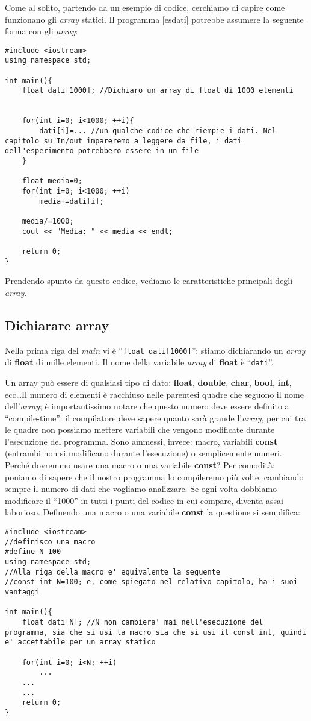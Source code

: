 Come al solito, partendo da un esempio di codice, cerchiamo di capire come funzionano gli \emph{array} statici. Il programma \ref{esdati} potrebbe assumere la seguente forma con gli \emph{array}:

\begin{lstlisting}
#include <iostream>
using namespace std;

int main(){
	float dati[1000]; //Dichiaro un array di float di 1000 elementi
	
	
	for(int i=0; i<1000; ++i){
		dati[i]=... //un qualche codice che riempie i dati. Nel capitolo su In/out impareremo a leggere da file, i dati dell'esperimento potrebbero essere in un file
	}
	
	float media=0;
	for(int i=0; i<1000; ++i)
		media+=dati[i];
	
	media/=1000;
	cout << "Media: " << media << endl;
	
	return 0;
}
\end{lstlisting}

Prendendo spunto da questo codice, vediamo le caratteristiche principali degli \emph{array}.
\subsection{Dichiarare array}

Nella prima riga del \emph{main} vi è ``\lstinline|float dati[1000]|'': stiamo dichiarando un \emph{array} di \textbf{float} di mille elementi. Il nome della variabile \emph{array} di \textbf{float} è ``\verb|dati|''. 
	
Un array può essere di qualsiasi tipo di dato: \textbf{float}, \textbf{double}, \textbf{char}, \textbf{bool}, \textbf{int}, ecc\ldots Il numero di elementi è racchiuso nelle parentesi quadre che seguono il nome dell'\emph{array}; è importantissimo notare che questo numero deve essere definito a ``compile-time'': il compilatore deve sapere quanto sarà grande l'\emph{array}, per cui tra le quadre non possiamo mettere variabili che vengono modificate durante l'esecuzione del programma. Sono ammessi, invece: macro, variabili \textbf{const} (entrambi non si modificano durante l'esecuzione) o semplicemente numeri. Perché dovremmo usare una macro o una variabile \textbf{const}? Per comodità: poniamo di sapere che il nostro programma lo compileremo più volte, cambiando sempre il numero di dati che vogliamo analizzare. Se ogni volta dobbiamo modificare il ``1000'' in tutti i punti del codice in cui compare, diventa assai laborioso. Definendo una macro o una variabile \textbf{const} la questione si semplifica:
	\begin{lstlisting}
#include <iostream>
//definisco una macro
#define N 100
using namespace std;
//Alla riga della macro e' equivalente la seguente
//const int N=100; e, come spiegato nel relativo capitolo, ha i suoi vantaggi

int main(){
	float dati[N]; //N non cambiera' mai nell'esecuzione del programma, sia che si usi la macro sia che si usi il const int, quindi e' accettabile per un array statico
	
	for(int i=0; i<N; ++i)
		...
	...
	...
	return 0;
}
	\end{lstlisting}
	
